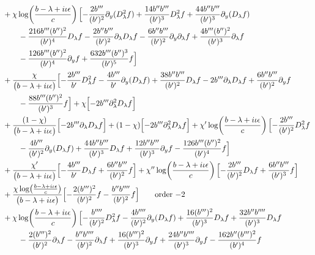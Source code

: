 \documentclass[reqno,11pt]{amsart}
\numberwithin{equation}{section}
\newcommand{\p}{\partial}
\newcommand{\D}{D_\lambda}
\numberwithin{equation}{section} %
\begin{document}
\begin{enumerate}
\begin{align}
&+\chi\log\!\left(\frac{b -\lambda+i\iota\epsilon}{c}\right)\Bigl[- \frac{2 b''' }{(b' )^{2}} \p_y(\D^2 f)+\frac{14 b''  b''' }{(b' )^{3}} \D^2 f+\frac{44 b''  b''' }{(b' )^{3}} \p_y(\D f)\notag\\
&\qquad - \frac{216 b'''  (b'' )^{2}}{(b' )^{4}} \D f- \frac{2 b''  b''' }{(b' )^{2}} \p_\lambda\D f- \frac{6 b''  b''' }{(b' )^{2}} \p_y\p_\lambda f+\frac{4 b'''  (b'' )^{2}}{(b' )^{3}} \p_\lambda f\notag\\
&\qquad - \frac{126 b'''  (b'' )^{2}}{(b' )^{4}} \p_y f+\frac{632 b'''  (b'' )^{3}}{(b' )^{5}} f\Bigr]\notag\\
&+\frac{\chi}{\bigl(b -\lambda+i\iota\epsilon\bigr)}\Bigl[- \frac{2 b''' }{b' } \D^2 f- \frac{4 b''' }{b' } \p_y(\D f)+\frac{38 b''  b''' }{(b' )^{2}} \D f - 2 b'''  \p_\lambda\D f+\frac{6 b''  b''' }{(b' )^{2}} \p_y f\notag\\
&\qquad - \frac{88 b'''  (b'' )^{2}}{(b' )^{3}} f\Bigr]+\chi\Bigl[- 2 b'''  \p_\lambda^2\D f\Bigr]\notag\\
&+\frac{(1-\chi)}{\bigl(b -\lambda+i\iota\epsilon\bigr)}\Bigl[- 2 b'''  \p_\lambda\D f\Bigr]+(1-\chi)\Bigl[- 2 b'''  \p_\lambda^2\D f\Bigr]+\chi'\log\!\left(\frac{b -\lambda+i\iota\epsilon}{c}\right)\Bigl[- \frac{2 b''' }{(b' )^{2}} \D^2 f\notag\\
&\qquad - \frac{4 b''' }{(b' )^{2}} \p_y(\D f)+\frac{44 b''  b''' }{(b' )^{3}} \D f+\frac{12 b''  b''' }{(b' )^{3}} \p_y f- \frac{126 b'''  (b'' )^{2}}{(b' )^{4}} f\Bigr]\notag\\
&+\frac{\chi'}{\bigl(b -\lambda+i\iota\epsilon\bigr)}\Bigl[- \frac{4 b''' }{b' } \D f+\frac{6 b''  b''' }{(b' )^{2}} f\Bigr]+\chi''\log\!\left(\frac{b -\lambda+i\iota\epsilon}{c}\right)\Bigl[- \frac{2 b''' }{(b' )^{2}} \D f+\frac{6 b''  b''' }{(b' )^{3}} f\Bigr]\notag\\
&+\frac{\chi\log\!\left(\frac{b -\lambda+i\iota\epsilon}{c}\right)}{\bigl(b -\lambda+i\iota\epsilon\bigr)}\Bigl[- \frac{2 (b''' )^{2}}{(b' )^{2}} f- \frac{b''  b'''' }{(b' )^{2}} f\Bigr]\tag*{\text{order $-2$}}\\
&+\chi\log\!\left(\frac{b -\lambda+i\iota\epsilon}{c}\right)\Bigl[- \frac{b'''' }{(b' )^{2}} \D^2 f- \frac{4 b'''' }{(b' )^{2}} \p_y(\D f)+\frac{16 (b''' )^{2}}{(b' )^{3}} \D f+\frac{32 b''  b'''' }{(b' )^{3}} \D f\notag\\
&\qquad - \frac{2 (b''' )^{2}}{(b' )^{2}} \p_\lambda f- \frac{b''  b'''' }{(b' )^{2}} \p_\lambda f+\frac{16 (b''' )^{2}}{(b' )^{3}} \p_y f+\frac{24 b''  b'''' }{(b' )^{3}} \p_y f- \frac{162 b''  (b''' )^{2}}{(b' )^{4}} f\notag\\

\end{align}
\end{enumerate}
\end{document}

